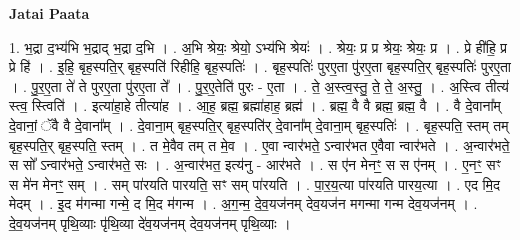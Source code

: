 \documentclass[17pt]{extarticle}
\begin{document}
\textbf{Jatai Paata} \newline

1. भ॒द्रा द॒भ्य॑भि भ॒द्राद् भ॒द्रा द॒भि । . अ॒भि श्रेयः॒ श्रेयो॒ ऽभ्य॑भि श्रेयः॑ । . श्रेयः॒ प्र प्र श्रेयः॒ श्रेयः॒ प्र । . प्रे ही॑हि॒ प्र प्रे हि॑ । . इ॒हि॒ बृह॒स्पति॒र् बृह॒स्पति॑ रिहीहि॒ बृह॒स्पतिः॑ । . बृह॒स्पतिः॑ पुरए॒ता पु॑रए॒ता बृह॒स्पति॒र् बृह॒स्पतिः॑ पुरए॒ता । . पु॒र॒ए॒ता ते॑ ते पुरए॒ता पु॑रए॒ता ते᳚ । . पु॒र॒ए॒तेति॑ पुरः - ए॒ता । . ते॒ अ॒स्त्व॒स्तु॒ ते॒ ते॒ अ॒स्तु॒ । . अ॒स्त्वि तीत्य॑ स्त्व॒ स्त्विति॑ । . इत्या॑हा॒हे तीत्या॑ह । . आ॒ह॒ ब्रह्म॒ ब्रह्मा॑हाह॒ ब्रह्म॑ । . ब्रह्म॒ वै वै ब्रह्म॒ ब्रह्म॒ वै । . वै दे॒वाना᳚म् दे॒वानां॒ ॅवै वै दे॒वाना᳚म् । . दे॒वाना॒म् बृह॒स्पति॒र् बृह॒स्पति॑र् दे॒वाना᳚म् दे॒वाना॒म् बृह॒स्पतिः॑ । . बृह॒स्पति॒ स्तम् तम् बृह॒स्पति॒र् बृह॒स्पति॒ स्तम् । . त मे॒वैव तम् त मे॒व । . ए॒वा न्वार॑भते॒ ऽन्वार॑भत ए॒वैवा न्वार॑भते । . अ॒न्वार॑भते॒ स सो᳚ ऽन्वार॑भते॒ ऽन्वार॑भते॒ सः । . अ॒न्वार॑भत॒ इत्य॑नु - आर॑भते । . स ए॑न मेनꣳ॒॒ स स ए॑नम् । . ए॒नꣳ॒॒ सꣳ स मे॑न मेनꣳ॒॒ सम् । . सम् पा॑रयति पारयति॒ सꣳ सम् पा॑रयति । . पा॒र॒य॒त्या पा॑रयति पारय॒त्या । . एद मि॒द मेदम् । . इ॒द म॑गन्मा गन्मे॒ द मि॒द म॑गन्म । . अ॒ग॒न्म॒ दे॒व॒यज॑नम् देव॒यज॑न मगन्मा गन्म देव॒यज॑नम् । . दे॒व॒यज॑नम् पृथि॒व्याः पृ॑थि॒व्या दे॑व॒यज॑नम् देव॒यज॑नम् पृथि॒व्याः । \newline
\end{document}
